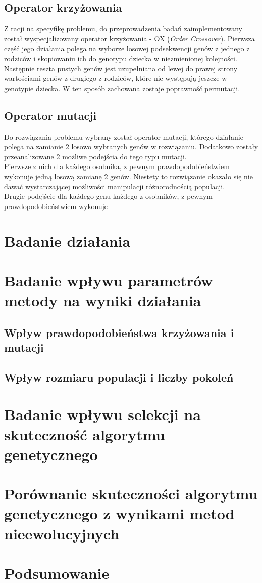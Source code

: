 \documentclass{article}
\begin{document}
	\subsection{Operator krzyżowania}
	Z racji na specyfikę problemu, do przeprowadzenia badań zaimplementowany został wyspecjalizowany operator krzyżowania - OX (\textit{Order Crossover}). Pierwsza część jego działania polega na wyborze losowej podsekwencji genów z jednego z rodziców i skopiowaniu ich do genotypu dziecka w niezmienionej kolejności. Następnie reszta pustych genów jest uzupełniana od lewej do prawej strony wartościami genów z drugiego z rodziców, które nie występują jeszcze w genotypie dziecka. W ten sposób zachowana zostaje poprawność permutacji.
	
	\subsection{Operator mutacji}\label{op:mutation}
	Do rozwiązania problemu wybrany został operator mutacji, którego działanie polega na zamianie 2 losowo wybranych genów w rozwiązaniu. Dodatkowo zostały przeanalizowane 2 możliwe podejścia do tego typu mutacji.
	\\Pierwsze z nich dla każdego osobnika, z pewnym prawdopodobieństwiem wykonuje jedną losową zamianę 2 genów. Niestety to rozwiązanie okazało się nie dawać wystarczającej możliwości manipulacji różnorodnością populacji.
	\\Drugie podejście dla każdego genu każdego z osobników, z pewnym prawdopodobieństwiem wykonuje
	\section{Badanie działania}
	\section{Badanie wpływu parametrów metody na \mbox{wyniki} działania}
	\subsection{Wpływ prawdopodobieństwa krzyżowania i mutacji}
	\subsection{Wpływ rozmiaru populacji i liczby pokoleń}
	\section{Badanie wpływu selekcji na skuteczność \mbox{algorytmu} genetycznego}
	\section{Porównanie skuteczności algorytmu genetycznego z wynikami metod nieewolucyjnych}
	\section{Podsumowanie}
	
\end{document}
